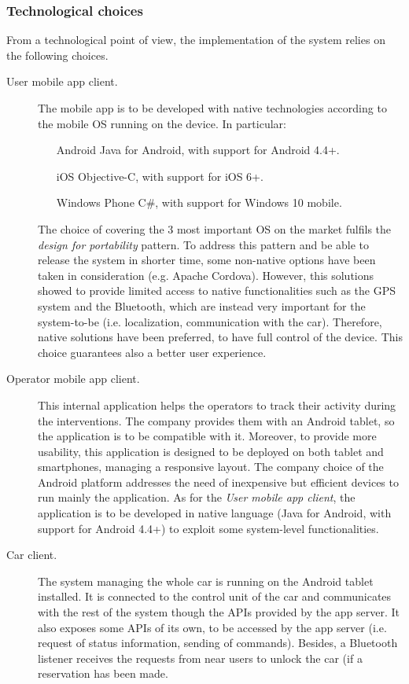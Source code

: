 \subsubsection{Technological choices}
	From a technological point of view, the implementation of the system relies on the following choices.
	\begin{description}
		\item[User mobile app client.] The mobile app is to be developed with native technologies according to the mobile OS running on the device. In particular:
			\begin{itemize}
				\item[Android] Java for Android, with support for Android 4.4+.
				\item[iOS] Objective-C, with support for iOS 6+.
				\item[Windows Phone] C\#, with support for Windows 10 mobile.
			\end{itemize}
		The choice of covering the 3 most important OS on the market fulfils the \textit{design for portability} pattern. To address this pattern and be able to release the system in shorter time, some non-native options have been taken in consideration (e.g. Apache Cordova). However, this solutions showed to provide limited access to native functionalities such as the GPS system and the Bluetooth, which are instead very important for the system-to-be (i.e. localization, communication with the car). Therefore, native solutions have been preferred, to have full control of the device. This choice guarantees also a better user experience.

		\item[Operator mobile app client.] This internal application helps the operators to track their activity during the interventions. The company provides them with an Android tablet, so the application is to be compatible with it. Moreover, to provide more usability, this application is designed to be deployed on both tablet and smartphones, managing a responsive layout. The company choice of the Android platform addresses the need of inexpensive but efficient devices to run mainly the application. As for the \textit{User mobile app client}, the application is to be developed in native language (Java for Android, with support for Android 4.4+) to exploit some system-level functionalities.

		\item[Car client.] The system managing the whole car is running on the Android tablet installed. It is connected to the control unit of the car and communicates with the rest of the system though the APIs provided by the app server. It also exposes some APIs of its own, to be accessed by the app server (i.e. request of status information, sending of commands). Besides, a Bluetooth listener receives the requests from near users to unlock the car (if a reservation has been made.


\end{description}
